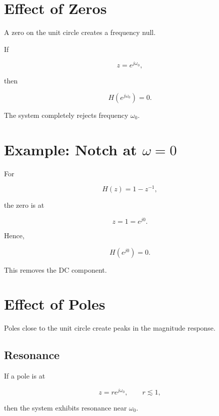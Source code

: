 
\section{Effect of Zeros}

A zero on the unit circle creates a frequency null.

If

\[
z=e^{j\omega_0},
\]

then

\[
H(e^{j\omega_0})=0.
\]

The system completely rejects frequency \(\omega_0\).


\section{Example: Notch at \(\omega=0\)}

For

\[
H(z)=1-z^{-1},
\]

the zero is at

\[
z=1=e^{j0}.
\]

Hence,

\[
H(e^{j0})=0.
\]

This removes the DC component.


\section{Effect of Poles}

Poles close to the unit circle create peaks in the magnitude response.


\subsection{Resonance}

If a pole is at

\[
z=re^{j\omega_0},
\qquad r\lesssim1,
\]

then the system exhibits resonance near \(\omega_0\).


